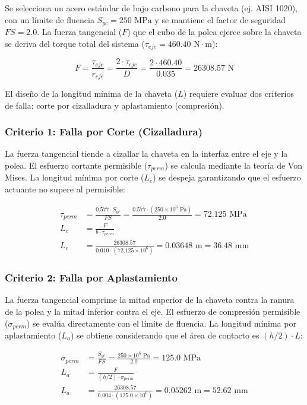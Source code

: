 \documentclass[12pt, a4paper]{article}
\begin{document}
Se selecciona un acero estándar de bajo carbono para la chaveta (ej. AISI 1020), con un límite de fluencia $S_{yc} = 250 \text{ MPa}$ y se mantiene el factor de seguridad $FS = 2.0$. La fuerza tangencial ($F$) que el cubo de la polea ejerce sobre la chaveta se deriva del torque total del sistema ($\tau_{eje} = 460.40 \text{ N}\cdot\text{m}$):

\begin{equation}
    F = \frac{\tau_{eje}}{r_{eje}} = \frac{2 \cdot \tau_{eje}}{D} = \frac{2 \cdot 460.40}{0.035} = 26308.57 \text{ N}
\end{equation}

El diseño de la longitud mínima de la chaveta ($L$) requiere evaluar dos criterios de falla: corte por cizalladura y aplastamiento (compresión). 

\subsubsection*{Criterio 1: Falla por Corte (Cizalladura)}
La fuerza tangencial tiende a cizallar la chaveta en la interfaz entre el eje y la polea. El esfuerzo cortante permisible ($\tau_{perm}$) se calcula mediante la teoría de Von Mises. La longitud mínima por corte ($L_c$) se despeja garantizando que el esfuerzo actuante no supere al permisible:

\begin{align}
    \tau_{perm} &= \frac{0.577 \cdot S_{yc}}{FS} = \frac{0.577 \cdot (250 \times 10^6 \text{ Pa})}{2.0} = 72.125 \text{ MPa} \\[6pt]
    L_c &= \frac{F}{b \cdot \tau_{perm}} \\[6pt]
    L_c &= \frac{26308.57}{0.010 \cdot (72.125 \times 10^6)} = 0.03648 \text{ m} = 36.48 \text{ mm}
\end{align}

\subsubsection*{Criterio 2: Falla por Aplastamiento}
La fuerza tangencial comprime la mitad superior de la chaveta contra la ranura de la polea y la mitad inferior contra el eje. El esfuerzo de compresión permisible ($\sigma_{perm}$) se evalúa directamente con el límite de fluencia. La longitud mínima por aplastamiento ($L_a$) se obtiene considerando que el área de contacto es $(h/2) \cdot L$:

\begin{align}
    \sigma_{perm} &= \frac{S_{yc}}{FS} = \frac{250 \times 10^6 \text{ Pa}}{2.0} = 125.0 \text{ MPa} \\[6pt]
    L_a &= \frac{F}{(h/2) \cdot \sigma_{perm}} \\[6pt]
    L_a &= \frac{26308.57}{0.004 \cdot (125.0 \times 10^6)} = 0.05262 \text{ m} = 52.62 \text{ mm}
\end{align}
\end{document}
